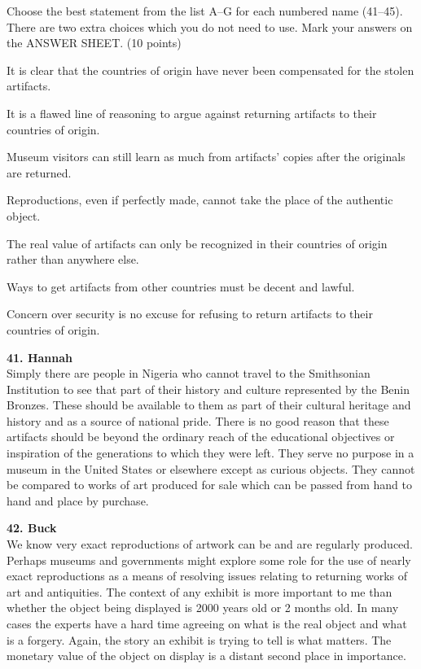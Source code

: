 \documentclass[12pt,a4paper]{article}
\begin{document}
\begin{partb}{
Choose the best statement from the list A--G for each numbered name (41--45). There are two extra choices which you do not need to use. Mark your answers on the ANSWER SHEET. (10 points)
}

\begin{enumerate}[label={[\Alph*]}, leftmargin=2em, itemsep=0.5em]
    \item It is clear that the countries of origin have never been compensated for the stolen artifacts.
    \item It is a flawed line of reasoning to argue against returning artifacts to their countries of origin.
    \item Museum visitors can still learn as much from artifacts' copies after the originals are returned.
    \item Reproductions, even if perfectly made, cannot take the place of the authentic object.
    \item The real value of artifacts can only be recognized in their countries of origin rather than anywhere else.
    \item Ways to get artifacts from other countries must be decent and lawful.
    \item Concern over security is no excuse for refusing to return artifacts to their countries of origin.
\end{enumerate}

\vspace{1em}
\noindent\textbf{41. Hannah}\\
Simply there are people in Nigeria who cannot travel to the Smithsonian Institution to see that part of their history and culture represented by the Benin Bronzes. These should be available to them as part of their cultural heritage and history and as a source of national pride. There is no good reason that these artifacts should be beyond the ordinary reach of the educational objectives or inspiration of the generations to which they were left. They serve no purpose in a museum in the United States or elsewhere except as curious objects. They cannot be compared to works of art produced for sale which can be passed from hand to hand and place by purchase.

\vspace{0.8em}
\noindent\textbf{42. Buck}\\
We know very exact reproductions of artwork can be and are regularly produced. Perhaps museums and governments might explore some role for the use of nearly exact reproductions as a means of resolving issues relating to returning works of art and antiquities. The context of any exhibit is more important to me than whether the object being displayed is 2000 years old or 2 months old. In many cases the experts have a hard time agreeing on what is the real object and what is a forgery. Again, the story an exhibit is trying to tell is what matters. The monetary value of the object on display is a distant second place in importance.


\end{partb}
\end{document}
